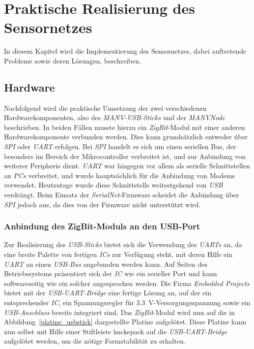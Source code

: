 
\chapter{Praktische Realisierung des Sensornetzes}\label{Implementierung}

In diesem Kapitel wird die Implementierung des Sensornetzes, dabei auftretende Probleme sowie deren Lösungen, beschreiben.

\section{Hardware}
Nachfolgend wird die praktische Umsetzung der zwei verschiedenen Hardwarekomponenten, also des \emph{MANV-USB-Sticks} und der
\emph{MANVNode} beschrieben. In beiden Fällen musste hierzu ein \emph{ZigBit}-Modul mit einer anderen 
Hardwarekomponente verbunden werden. Dies kann grundsätzlich entweder über \emph{SPI} oder \emph{UART} erfolgen.
Bei \emph{SPI} handelt es sich um einen seriellen Bus, der besonders im Bereich der Mikrocontroller verbreitet ist,
und zur Anbindung von weiterer Peripherie dient. \emph{UART} war hingegen vor allem als serielle Schnittstellen
an \emph{PCs} verbreitet, und wurde hauptsächlich für die Anbindung von Modems verwendet. Heutzutage wurde diese
Schnittstelle weitestgehend von \emph{USB} verdrängt. Beim Einsatz der \emph{SerialNet}-Firmware scheidet die
Anbindung über \emph{SPI} jedoch aus, da dies von der Firmware nicht unterstützt wird.

\subsection{Anbindung des ZigBit-Moduls an den USB-Port}
Zur Realisierung des \emph{USB-Sticks} bietet sich die Verwendung des \emph{UARTs} an, da eine breite Palette 
von fertigen \emph{ICs} zur Verfügung steht, mit deren Hilfe ein \emph{UART} an einen \emph{USB-Bus} angebunden werden 
kann. Auf Seiten des Betriebssystems präsentiert sich der \emph{IC} wie ein serieller Port und kann softwareseitig
wie ein solcher angesprochen werden. Die Firma \emph{Embedded Projects} bietet mit der \emph{USB-UART-Bridge}
eine fertige Lösung an, auf der ein entsprechender \emph{IC}, ein Spannungsregler für 3.3~V-Versorgungsspannung
sowie ein \emph{USB-Anschluss} bereits integriert sind. Das \emph{ZigBit}-Modul wird nun auf die in 
Abbildung~\ref{platine_usbstick} dargestellte Platine aufgelötet. Diese Platine kann nun selbst mit Hilfe einer
Stiftleiste huckepack auf die \emph{USB-UART-Bridge} aufgelötet werden, um die nötige Formstabilität zu erhalten.

